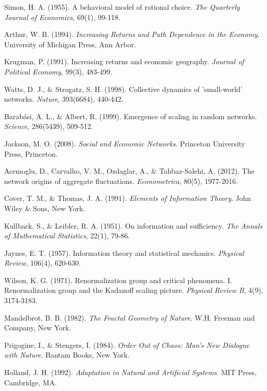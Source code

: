\documentclass[12pt,a4paper]{article}
\begin{document}
\begin{thebibliography}{99}
 Simon, H. A. (1955). A behavioral model of rational choice. \textit{The Quarterly Journal of Economics}, 69(1), 99-118.

 Arthur, W. B. (1994). \textit{Increasing Returns and Path Dependence in the Economy}. University of Michigan Press, Ann Arbor.

 Krugman, P. (1991). Increasing returns and economic geography. \textit{Journal of Political Economy}, 99(3), 483-499.

 Watts, D. J., \& Strogatz, S. H. (1998). Collective dynamics of 'small-world' networks. \textit{Nature}, 393(6684), 440-442.

 Barabási, A. L., \& Albert, R. (1999). Emergence of scaling in random networks. \textit{Science}, 286(5439), 509-512.

 Jackson, M. O. (2008). \textit{Social and Economic Networks}. Princeton University Press, Princeton.

 Acemoglu, D., Carvalho, V. M., Ozdaglar, A., \& Tahbaz-Salehi, A. (2012). The network origins of aggregate fluctuations. \textit{Econometrica}, 80(5), 1977-2016.

 Cover, T. M., \& Thomas, J. A. (1991). \textit{Elements of Information Theory}. John Wiley \& Sons, New York.

 Kullback, S., \& Leibler, R. A. (1951). On information and sufficiency. \textit{The Annals of Mathematical Statistics}, 22(1), 79-86.

 Jaynes, E. T. (1957). Information theory and statistical mechanics. \textit{Physical Review}, 106(4), 620-630.

 Wilson, K. G. (1971). Renormalization group and critical phenomena. I. Renormalization group and the Kadanoff scaling picture. \textit{Physical Review B}, 4(9), 3174-3183.

 Mandelbrot, B. B. (1982). \textit{The Fractal Geometry of Nature}. W.H. Freeman and Company, New York.

 Prigogine, I., \& Stengers, I. (1984). \textit{Order Out of Chaos: Man's New Dialogue with Nature}. Bantam Books, New York.

 Holland, J. H. (1992). \textit{Adaptation in Natural and Artificial Systems}. MIT Press, Cambridge, MA.


\end{thebibliography}
\end{document}
